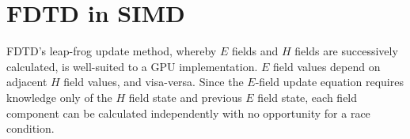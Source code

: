 \section{FDTD in SIMD}

FDTD's leap-frog update method, whereby $E$ fields and $H$ fields are successively calculated, is well-suited to a GPU implementation. $E$ field values depend on adjacent $H$ field values, and visa-versa. Since the $E$-field update equation requires knowledge only of the $H$ field state and previous $E$ field state, each field component can be calculated independently with no opportunity for a race condition. 

